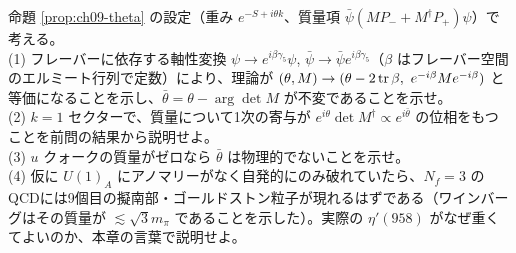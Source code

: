 \begin{problem}[難易度 C]\label{ch09-prob-theta}
命題 \ref{prop:ch09-theta} の設定（重み $e^{-S+i\theta k}$、質量項 $\bar\psi(MP_-+M^\dagger P_+)\psi$）で考える。\\
(1) フレーバーに依存する軸性変換 $\psi\to e^{i\beta\gamma_5}\psi$, $\bar\psi\to\bar\psi e^{i\beta\gamma_5}$（$\beta$ はフレーバー空間のエルミート行列で定数）により、理論が $(\theta,M)\to(\theta-2\tr\beta,\ e^{-i\beta}Me^{-i\beta})$ と等価になることを示し、$\bar\theta=\theta-\arg\det M$ が不変であることを示せ。\\
(2) $k=1$ セクターで、質量について1次の寄与が $e^{i\theta}\det M^\dagger\propto e^{i\bar\theta}$ の位相をもつことを前問の結果から説明せよ。\\
(3) $u$ クォークの質量がゼロなら $\bar\theta$ は物理的でないことを示せ。\\
(4) 仮に $U(1)_A$ にアノマリーがなく自発的にのみ破れていたら、$N_f=3$ のQCDには9個目の擬南部・ゴールドストン粒子が現れるはずである（ワインバーグはその質量が $\lesssim\sqrt3m_\pi$ であることを示した）。実際の $\eta'(958)$ がなぜ重くてよいのか、本章の言葉で説明せよ。
\end{problem}

